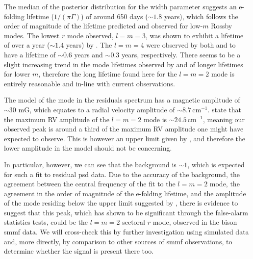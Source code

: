 The median of the posterior distribution for the width parameter suggests an e-folding lifetime ($1/(\pi \Gamma)$) of around 650 days ($\sim 1.8$ years), which follows the order of magnitude of the lifetime predicted and observed for low-$m$ Rossby modes. The lowest $r$ mode observed, $l=m=3$, was shown to exhibit a lifetime of over a year ($\sim 1.4$ years) by \citet{liang_time-distance_2019}. The $l=m=4$ were observed by both \citet{loptien_global-scale_2018} and \citet{liang_time-distance_2019} to have a lifetime of $\sim 0.6$ years and $\sim 0.3$ years, respectively. There seems to be a slight increasing trend in the mode lifetimes observed by \citet{loptien_global-scale_2018} and \citet{liang_time-distance_2019} of longer lifetimes for lower $m$, therefore the long lifetime found here for the $l=m=2$ mode is entirely reasonable and in-line with current observations.

The model of the mode in the residuals spectrum has a magnetic amplitude of $\sim 30$ mG, which equates to a radial velocity amplitude of $\sim 8.7 \, \mathrm{cm}^{-1}$. \citet{lanza_sectoral_2019} state that the maximum RV amplitude of the $l=m=2$ mode is $\sim 24.5 \,\mathrm{cm}^{-1}$, meaning our observed peak is around a third of the maximum RV amplitude one might have expected to observe. This is however an upper limit given by \citet{lanza_sectoral_2019}, and therefore the lower amplitude in the model should not be concerning.

In particular, however, we can see that the background is $\sim 1$, which is expected for such a fit to residual \gls{psd} data. Due to the accuracy of the background, the agreement between the central frequency of the fit to the $l=m=2$ mode, the agreement in the order of magnitude of the e-folding lifetime, and the amplitude of the mode residing below the upper limit suggested by \citet{lanza_sectoral_2019}, there is evidence to suggest that this peak, which has shown to be significant through the false-alarm statistics tests, could be the $l=m=2$ sectoral $r$ mode, observed in the \gls{bison} \gls{smmf} data. We will cross-check this by further investigation using simulated data and, more directly, by comparison to other sources of \gls{smmf} observations, to determine whether the signal is present there too.







